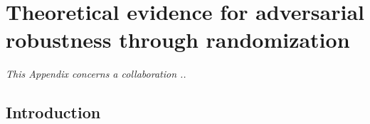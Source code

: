 \chapter{Theoretical evidence for adversarial robustness through randomization}
\label{chapter:theoretical_evidence_for_adversarial_robustness_through_randomization}
\localtableofcontents

\emph{This Appendix concerns a collaboration ..}


%

\section{Introduction}
\label{section:ap2-introduction}


